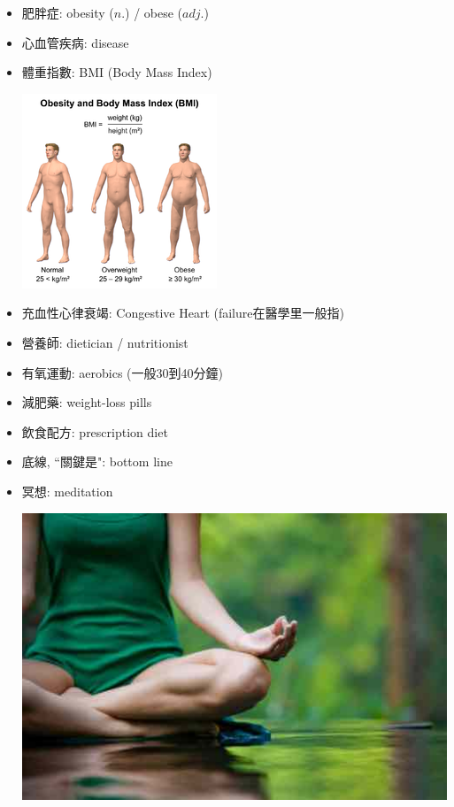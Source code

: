 \begin{multicols}{2}
\begin{itemize}
\begin{center}
  \end{center}
  \item 肥胖症: obesity ($n.$) / obese ($adj.$) 
  \item 心血管疾病:  disease
  \item 體重指數: BMI (Body Mass Index)
  \begin{center}
    \includegraphics[scale=1]{pics/bmi}
  \end{center}
  \item 充血性心律衰竭: Congestive Heart  (failure在醫學里一般指)
  \item 營養師: dietician / nutritionist
  \item 有氧運動: aerobics (一般30到40分鐘)
  \item 減肥藥: weight-loss pills
  \item 飲食配方: prescription diet
  \item 底線, ``關鍵是": bottom line
  \item 冥想: meditation
  \begin{center}
    \includegraphics[scale=.3]{pics/meditation}
  \end{center}

\end{itemize}
\end{multicols}
